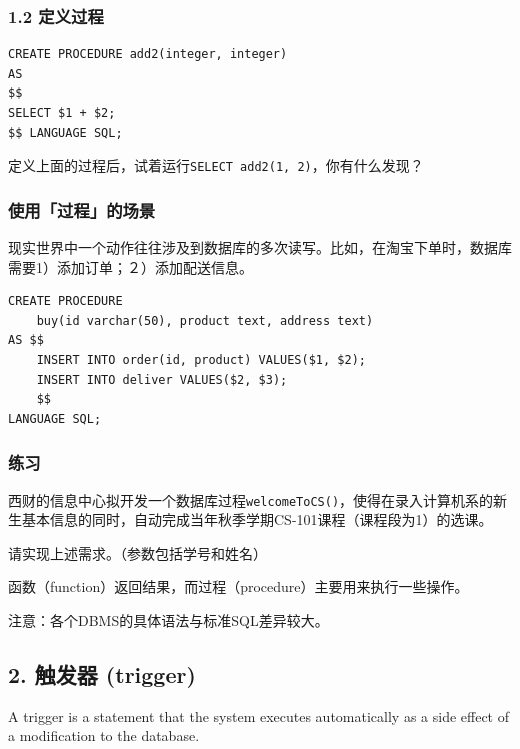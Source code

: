 \documentclass[aspectratio=169, 14pt]{beamer}
\begin{document}
\begin{frame}[fragile]
    \frametitle{1.2 定义过程}

    \begin{verbatim}
CREATE PROCEDURE add2(integer, integer)
AS
$$
SELECT $1 + $2;
$$ LANGUAGE SQL;
    \end{verbatim}

 定义上面的过程后，试着运行\texttt{SELECT add2(1, 2)}，你有什么发现？
\end{frame}

\begin{frame}[fragile]
    \frametitle{使用「过程」的场景}
现实世界中一个动作往往涉及到数据库的多次读写。比如，在淘宝下单时，数据库需要1）添加订单；２）添加配送信息。
    
\begin{verbatim}
CREATE PROCEDURE 
    buy(id varchar(50), product text, address text)
AS $$
    INSERT INTO order(id, product) VALUES($1, $2);
    INSERT INTO deliver VALUES($2, $3);
    $$ 
LANGUAGE SQL;
\end{verbatim}

\end{frame}

\begin{frame}
    \frametitle{练习}
西财的信息中心拟开发一个数据库过程\texttt{welcomeToCS()}，使得在录入计算机系的新生基本信息的同时，自动完成当年秋季学期CS-101课程（课程段为1）的选课。

请实现上述需求。（参数包括学号和姓名）

\end{frame}

{
\begin{frame}[standout]
    函数（function）返回结果，而过程（procedure）主要用来执行一些操作。

    {\small {} 注意：各个DBMS的具体语法与标准SQL差异较大。}
\end{frame}
}

\begin{frame}[fragile]
    \section{\textcolor{darkmidnightblue}{2. 触发器 (trigger)}}
    A \alert{trigger} is a statement that the system executes automatically as a side effect of a modification to the database.
\end{frame}
\end{document}

